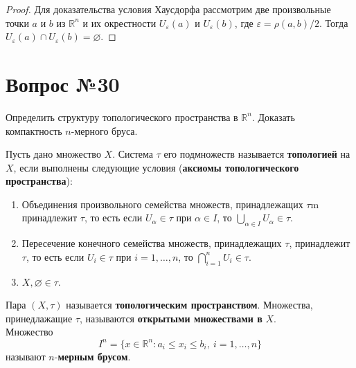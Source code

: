 \documentclass[12pt]{report}
\numberwithin{equation}{section}
\begin{document}
\begin{proof}
Для доказательства условия Хаусдорфа рассмотрим две произвольные точки $a$ и $b$ из $\mathbb{R}^n$ и их окрестности $U_{\varepsilon}(a)$ и $U_{\varepsilon}(b)$, где $\varepsilon = \rho(a,b) / 2$. Тогда $U_{\varepsilon}(a) \cap U_{\varepsilon}(b) = \varnothing$.
\end{proof}

\newpage \section{Вопрос №30} %
\begin{framed}
Определить структуру топологического пространства в $\mathbb{R}^n$. Доказать компактность $n$-мерного бруса.
\end{framed}
Пусть дано множество $X$. Система $\tau$ его подмножеств называется \textbf{топологией} на $X$, если выполнены следующие условия (\textbf{аксиомы топологического пространcтва}):
\begin{enumerate}
\item Объединения произвольного семейства множеств, принадлежащих $\tau$m принадлежит $\tau$, то есть если $U_{\alpha} \in \tau$ при $\alpha \in I$, то $\bigcup\limits_{\alpha \in I} U_{\alpha} \in \tau$. \label{ax:29:1}
\item Пересечение конечного семейства множеств, принадлежащих $\tau$, принадлежит $\tau$, то есть если $U_i \in \tau$ при $i = 1, \ldots, n$, то $\bigcap\limits_{i = 1}^n U_i \in \tau$. \label{ax:29:2}
\item $X, \varnothing \in \tau$. \label{ax:29:3}
\end{enumerate}

Пара $(X, \tau)$ называется \textbf{топологическим пространством}. Множества, принедлажащие $\tau$, называются \textbf{открытыми множествами в} $X$.\\

Множество
\[ I^n = \{ x \in \mathbb{R}^n: a_i \leqslant x_i \leqslant b_i, ~i = 1, \ldots, n \}\]
называют $n$-\textbf{мерным брусом}.
\end{document}

